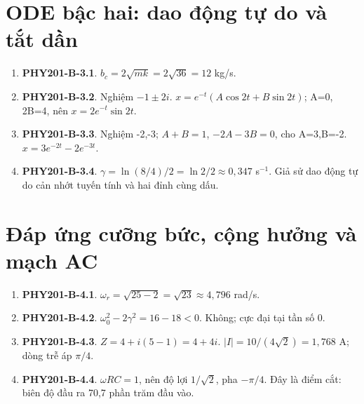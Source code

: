 \documentclass[11pt,a4paper,openany]{book}
\begin{document}
\section{ODE bậc hai: dao động tự do và tắt dần}
\begin{enumerate}
\item \textbf{PHY201-B-3.1}. $b_c=2\sqrt{mk}=2\sqrt{36}=12$ kg/s.
\item \textbf{PHY201-B-3.2}. Nghiệm $-1\pm2i$. $x=e^{-t}(A\cos2t+B\sin2t)$; A=0, 2B=4, nên $x=2e^{-t}\sin2t$.
\item \textbf{PHY201-B-3.3}. Nghiệm -2,-3; $A+B=1$, $-2A-3B=0$, cho A=3,B=-2. $x=3e^{-2t}-2e^{-3t}$.
\item \textbf{PHY201-B-3.4}. $\gamma=\ln(8/4)/2=\ln2/2\approx0{,}347$ s$^{-1}$. Giả sử dao động tự do cản nhớt tuyến tính và hai đỉnh cùng dấu.
\end{enumerate}
\section{Đáp ứng cưỡng bức, cộng hưởng và mạch AC}
\begin{enumerate}
\item \textbf{PHY201-B-4.1}. $\omega_r=\sqrt{25-2}=\sqrt{23}\approx4{,}796$ rad/s.
\item \textbf{PHY201-B-4.2}. $\omega_0^2-2\gamma^2=16-18<0$. Không; cực đại tại tần số 0.
\item \textbf{PHY201-B-4.3}. $Z=4+i(5-1)=4+4i$. $|I|=10/(4\sqrt2)=1{,}768$ A; dòng trễ áp $\pi/4$.
\item \textbf{PHY201-B-4.4}. $\omega RC=1$, nên độ lợi $1/\sqrt2$, pha $-\pi/4$. Đây là điểm cắt: biên độ đầu ra 70,7 phần trăm đầu vào.
\end{enumerate}
\end{document}
